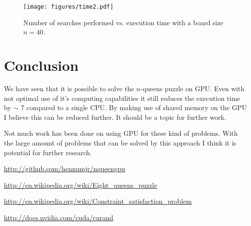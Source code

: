 \documentclass{article}
\begin{document}
\begin{figure}[H]
     \begin{center}
         \texttt{[image: figures/time2.pdf]}
     \end{center}
     \caption{Number of searches performed vs. execution time with a board size $n = 40$.}
     \label{fig:time}
 \end{figure}

\section{Conclusion}

We have seen that it is possible to solve the $n$-queens puzzle on GPU. Even with not optimal use 
of it's computing capabilities it still reduces the execution time by $\sim$ 7 compared to a single
CPU. By making use of shared memory on the GPU I believe this can
be reduced further. It should be a topic for further work. 

Not much work has been done on using GPU for these kind of problems. With the large amount 
of problems that can be solved by this approach I think it is potential for further research.

\begin{thebibliography}{9}

    \url{http://github.com/hennumjr/nqueengpu}

	\url{http://en.wikipedia.org/wiki/Eight_queens_puzzle}

    \url{http://en.wikipedia.org/wiki/Constraint_satisfaction_problem}

    \url{http://docs.nvidia.com/cuda/curand}

\end{thebibliography} 

\appendix
\end{document}
